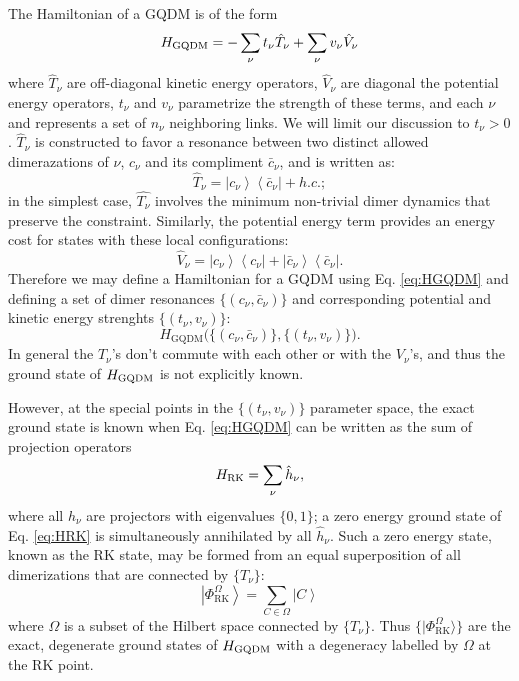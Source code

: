 \documentclass[twocolumn,prb,aps,floatfix,superscriptaddress]{revtex4-1}
\newcommand{\ket}[1]{| #1 \rangle}
\newcommand{\eket}[1]{\left | #1 \right \rangle}
\newcommand{\ebra}[1]{\left \langle #1 \right |}
\newcommand{\Eqref}[1]{Eq. \eqref{#1}}
\newcommand{\RK}{\mathrm{RK}}
\newcommand{\HGQDM}{H_\mathrm{GQDM}}
\begin{document}
The Hamiltonian of a GQDM is of the form
\begin{equation}
H_{\rm{GQDM}} = -\sum_\nu t_\nu \hat{T}_{\nu} + \sum_\nu v_\nu \hat{V}_{\nu} \label{eq:HGQDM}
\end{equation}
where $\hat{T}_\nu$ are off-diagonal kinetic energy operators, $\hat{V}_\nu$ are diagonal the potential energy operators, $t_\nu$ and $v_\nu$ parametrize the strength of these terms, and each $\nu$ and represents a set of $n_\nu$ neighboring links. We will limit our discussion to $t_\nu >0$. $\hat{T}_\nu$ is constructed to favor a resonance between two distinct allowed dimerazations of $\nu$, $c_\nu$ and its compliment $\bar{c}_\nu$, and is written as:
\begin{equation}
\hat{T}_{\nu} = \eket{c_\nu}\ebra{\bar{c}_\nu} + h.c.;
\end{equation}
in the simplest case, $\hat{T_\nu}$ involves the minimum non-trivial dimer dynamics that preserve the constraint. Similarly, the potential energy term provides an energy cost for states with these local configurations:
\begin{equation}
\hat{V}_{\nu} = \eket{c_\nu}\ebra{c_\nu} +  \eket{\bar{c}_\nu}\ebra{\bar{c}_\nu}.
\end{equation}
Therefore we may define a Hamiltonian for a GQDM using \Eqref{eq:HGQDM} and defining a set of dimer resonances $\{(c_\nu,\bar{c}_\nu)\}$ and corresponding potential and kinetic energy strenghts $\{(t_\nu,v_\nu)\}$:
\begin{equation}
\HGQDM \biggl( \bigl\{\left(c_\nu,\bar{c}_\nu\right)\},\{\left(t_\nu,v_\nu\right)\bigr\}\biggr).
\end{equation}
 In general the $T_\nu$'s don't commute with each other or with the $V_\nu$'s, and thus the ground state of $H_{\rm{GQDM}}$ is not explicitly known.

However, at the special points in the $\{(t_\nu,v_\nu)\}$ parameter space, the exact ground state is known when \Eqref{eq:HGQDM} can be written as the sum of projection operators
\begin{equation}
H_{\rm{RK}} = \sum_\nu \hat{h}_\nu \label{eq:HRK},
\end{equation}
where all $h_\nu$ are projectors with eigenvalues $\{0,1\}$; a zero energy ground state of \Eqref{eq:HRK} is simultaneously annihilated by all $\hat{h}_\nu$. Such a zero energy state, known as the RK state, may be formed from an equal superposition of all dimerizations that are connected by $\{T_\nu\}$:
\begin{equation}
\eket{\Phi_{\RK}^{\Omega}} = \sum_{C \in \Omega} \eket{C}
\end{equation} 
where $\Omega$ is a subset of the Hilbert space connected by $\{T_\nu\}$. Thus $\{ \ket{\Phi_{\RK}^\Omega} \}$ are the exact, degenerate ground states of $H_{\rm{GQDM}}$ with a degeneracy labelled by $\Omega$ at the RK point.
\end{document}
